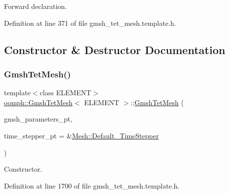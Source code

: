 Forward declaration. 

Definition at line 371 of file gmsh\+\_\+tet\+\_\+mesh.\+template.\+h.



\subsection{Constructor \& Destructor Documentation}
\mbox{\label{classoomph_1_1GmshTetMesh_a3f9c7d2c2a617f4b497778ff44109dbc}} 
\subsubsection{\texorpdfstring{Gmsh\+Tet\+Mesh()}{GmshTetMesh()}\hspace{0.1cm}{\footnotesize\ttfamily [1/2]}}
{\footnotesize\ttfamily template$<$class E\+L\+E\+M\+E\+NT$>$ \\
\hyperlink{classoomph_1_1GmshTetMesh}{oomph\+::\+Gmsh\+Tet\+Mesh}$<$ E\+L\+E\+M\+E\+NT $>$\+::\hyperlink{classoomph_1_1GmshTetMesh}{Gmsh\+Tet\+Mesh} (\begin{DoxyParamCaption}\item[{\hyperlink{classoomph_1_1GmshParameters}{Gmsh\+Parameters} $\ast$}]{gmsh\+\_\+parameters\+\_\+pt,  }\item[{\hyperlink{classoomph_1_1TimeStepper}{Time\+Stepper} $\ast$}]{time\+\_\+stepper\+\_\+pt = {\ttfamily \&\hyperlink{classoomph_1_1Mesh_a12243d0fee2b1fcee729ee5a4777ea10}{Mesh\+::\+Default\+\_\+\+Time\+Stepper}} }\end{DoxyParamCaption})\hspace{0.3cm}{\ttfamily [inline]}}



Constructor. 



Definition at line 1700 of file gmsh\+\_\+tet\+\_\+mesh.\+template.\+h.

\mbox{\label{classoomph_1_1GmshTetMesh_a8b93f46d9a6a442f6d5e9b8e86f33882}} 
